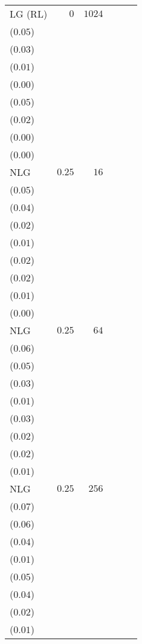\begin{table}[t]
\begin{tabular}{lrrrrr}
LG {\scriptsize(RL)} & \(0\) & \(1024\) & \longcell{\(0.54\)\\{\tiny(\(0.05\))}} & \longcell{\(0.21\)\\{\tiny(\(0.03\))}} & \longcell{\(0.04\)\\{\tiny(\(0.01\))}} & \longcell{\(0.01\)\\{\tiny(\(0.00\))}} & \longcell{\(0.31\)\\{\tiny(\(0.05\))}} & \longcell{\(0.10\)\\{\tiny(\(0.02\))}} & \longcell{\(0.02\)\\{\tiny(\(0.00\))}} & \longcell{\(0.00\)\\{\tiny(\(0.00\))}} \\[2.2e\\[2.2ex]
NLG & \(0.25\) & \(16\) & \longcell{\(0.18\)\\{\tiny(\(0.05\))}} & \longcell{\(0.15\)\\{\tiny(\(0.04\))}} & \longcell{\(0.11\)\\{\tiny(\(0.02\))}} & \longcell{\(0.05\)\\{\tiny(\(0.01\))}} & \longcell{\(0.06\)\\{\tiny(\(0.02\))}} & \longcell{\(0.05\)\\{\tiny(\(0.02\))}} & \longcell{\(0.04\)\\{\tiny(\(0.01\))}} & \longcell{\(0.02\)\\{\tiny(\(0.00\))}} \\[2.2e\\[2.2ex]
NLG & \(0.25\) & \(64\) & \longcell{\(0.30\)\\{\tiny(\(0.06\))}} & \longcell{\(0.26\)\\{\tiny(\(0.05\))}} & \longcell{\(0.19\)\\{\tiny(\(0.03\))}} & \longcell{\(0.08\)\\{\tiny(\(0.01\))}} & \longcell{\(0.12\)\\{\tiny(\(0.03\))}} & \longcell{\(0.10\)\\{\tiny(\(0.02\))}} & \longcell{\(0.07\)\\{\tiny(\(0.02\))}} & \longcell{\(0.03\)\\{\tiny(\(0.01\))}} \\[2.2e\\[2.2ex]
NLG & \(0.25\) & \(256\) & \longcell{\(0.44\)\\{\tiny(\(0.07\))}} & \longcell{\(0.39\)\\{\tiny(\(0.06\))}} & \longcell{\(0.28\)\\{\tiny(\(0.04\))}} & \longcell{\(0.11\)\\{\tiny(\(0.01\))}} & \longcell{\(0.23\)\\{\tiny(\(0.05\))}} & \longcell{\(0.19\)\\{\tiny(\(0.04\))}} & \longcell{\(0.12\)\\{\tiny(\(0.02\))}} & \longcell{\(0.05\)\\{\tiny(\(0.01\))}} \\[2.2e\\[2.2ex]

\end{tabular}
\end{table}
